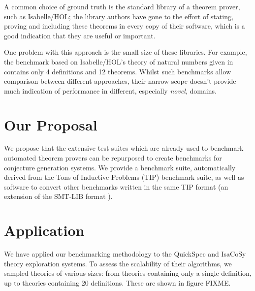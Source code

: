 A common choice of ground truth is the standard library of a theorem prover,
such as Isabelle/HOL; the library authors have gone to the effort of stating,
proving and including these theorems in every copy of their software, which is a
good indication that they are useful or important.

One problem with this approach is the small size of these libraries. For
example, the benchmark based on Isabelle/HOL's theory of natural numbers given
in~\cite{Johansson.Dixon.Bundy:conjecture-generation} contains
only 4 definitions and 12 theorems. Whilst such benchmarks allow
comparison between different approaches, their narrow scope doesn't provide much
indication of performance in different, especially \emph{novel}, domains.

\section{Our Proposal}
\label{section:proposal}

We propose that the extensive test suites which are already used to benchmark
automated theorem provers can be repurposed to create benchmarks for conjecture
generation systems. We provide a benchmark suite, automatically derived from the
Tons of Inductive Problems (TIP) benchmark suite, as well as software to convert
other benchmarks written in the same TIP format (an extension of the SMT-LIB
format \cite{BarFT-SMTLIB}).



\section{Application}
\label{section:application}


We have applied our benchmarking methodology to the QuickSpec and IsaCoSy theory
exploration systems. To assess the scalability of their algorithms, we sampled
theories of various sizes: from theories containing only a single definition, up
to theories containing 20 definitions. These are shown in figure FIXME.

